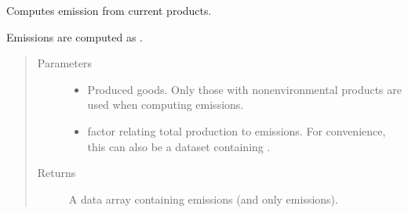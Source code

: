 \documentclass[letterpaper,10pt,english]{sphinxmanual}
\begin{document}
\begin{fulllineitems}
\label{\detokenize{api:muse.quantities.emission}}
Computes emission from current products.

Emissions are computed as .
\begin{quote}\begin{description}
\item[{Parameters}] \leavevmode\begin{itemize}
\item {} 
 \textendash{} Produced goods. Only those with non\sphinxhyphen{}environmental products are used
when computing emissions.

\item {} 
 \textendash{} factor relating total production to emissions. For convenience,
this can also be a  dataset containing .

\end{itemize}

\item[{Returns}] \leavevmode
A data array containing emissions (and only emissions).

\end{description}\end{quote}

\end{fulllineitems}

\end{document}
